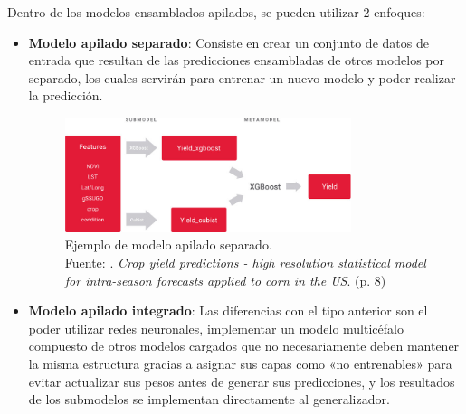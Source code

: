 \newpage
Dentro de los modelos ensamblados apilados, se pueden utilizar 2 enfoques:
\begin{itemize}
	\item \textbf{Modelo apilado separado}: Consiste en crear un conjunto de datos de entrada que resultan de las predicciones ensambladas de otros modelos por separado, los cuales servirán para entrenar un nuevo modelo y poder realizar la predicción.
	
	\begin{figure}[!ht]
		\begin{center}
			\includegraphics[width=0.79\textwidth]{2/figures/separate_stacked_model.png}
			\caption[Ejemplo de modelo apilado separado]{Ejemplo de modelo apilado separado.\\
			Fuente: \cite{tec_cai2017forecast}. \textit{Crop yield predictions - high resolution statistical model for intra-season forecasts applied to corn in the US}. (p. 8)}
			\label{2:fig82}
		\end{center}
	\end{figure}
	
	\item \textbf{Modelo apilado integrado}: Las diferencias con el tipo anterior son el poder utilizar redes neuronales, implementar un modelo multicéfalo compuesto de otros modelos cargados que no necesariamente deben mantener la misma estructura gracias a asignar sus capas como «no entrenables» para evitar actualizar sus pesos antes de generar sus predicciones, y los resultados de los submodelos se implementan directamente al generalizador.
	

\end{itemize}
